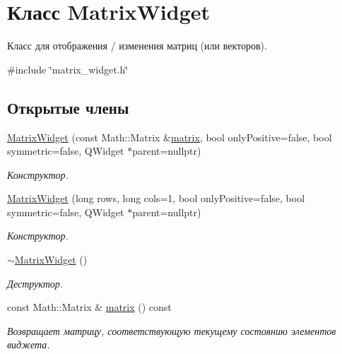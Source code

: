 \hypertarget{class_matrix_widget}{}\section{Класс Matrix\+Widget}
\label{class_matrix_widget}


Класс для отображения / изменения матриц (или векторов).  




{\ttfamily \#include \char`\"{}matrix\+\_\+widget.\+h\char`\"{}}

\subsection*{Открытые члены}
\begin{DoxyCompactItemize}
\item 
\hyperlink{class_matrix_widget_a127414cc00d40d2b62721bcf49286c89}{Matrix\+Widget} (const Math\+::\+Matrix \&\hyperlink{class_matrix_widget_a41ebf140a55e3e2ff589d2a0b8ad0feb}{matrix}, bool only\+Positive=false, bool symmetric=false, Q\+Widget $\ast$parent=nullptr)
\begin{DoxyCompactList}\small\item\em Конструктор. \end{DoxyCompactList}\item 
\hyperlink{class_matrix_widget_a3eb9219f9cf1bd7e9569a2557cafbf91}{Matrix\+Widget} (long rows, long cols=1, bool only\+Positive=false, bool symmetric=false, Q\+Widget $\ast$parent=nullptr)
\begin{DoxyCompactList}\small\item\em Конструктор. \end{DoxyCompactList}\item 
\hyperlink{class_matrix_widget_a64970508bea25f769ea0e8884985a490}{$\sim$\+Matrix\+Widget} ()\hypertarget{class_matrix_widget_a64970508bea25f769ea0e8884985a490}{}\label{class_matrix_widget_a64970508bea25f769ea0e8884985a490}

\begin{DoxyCompactList}\small\item\em Деструктор. \end{DoxyCompactList}\item 
const Math\+::\+Matrix \& \hyperlink{class_matrix_widget_a41ebf140a55e3e2ff589d2a0b8ad0feb}{matrix} () const \hypertarget{class_matrix_widget_a41ebf140a55e3e2ff589d2a0b8ad0feb}{}\label{class_matrix_widget_a41ebf140a55e3e2ff589d2a0b8ad0feb}

\begin{DoxyCompactList}\small\item\em Возвращает матрицу, соответствующую текущему состоянию элементов виджета. \end{DoxyCompactList}\end{DoxyCompactItemize}
